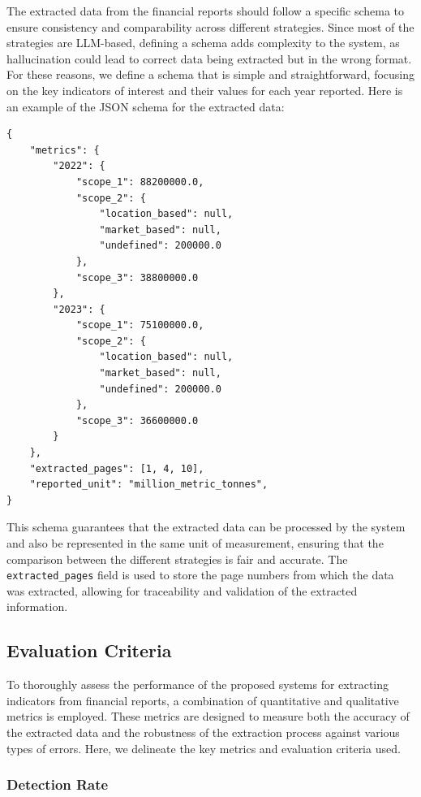 \documentclass[english, 12pt, a4paper, elec, utf8, a-2b, online]{aaltothesis}
\begin{document}
The extracted data from the financial reports should follow a specific schema to ensure consistency and comparability across different strategies.
Since most of the strategies are \ac{LLM}-based, defining a schema adds complexity to the system, as hallucination could lead to correct data being extracted but in the wrong format.
For these reasons, we define a schema that is simple and straightforward, focusing on the key indicators of interest and their values for each year reported.
Here is an example of the \ac{JSON} schema for the extracted data:

\begin{verbatim}
{
    "metrics": {
        "2022": {
            "scope_1": 88200000.0,
            "scope_2": {
                "location_based": null,
                "market_based": null,
                "undefined": 200000.0
            },
            "scope_3": 38800000.0
        },
        "2023": {
            "scope_1": 75100000.0,
            "scope_2": {
                "location_based": null,
                "market_based": null,
                "undefined": 200000.0
            },
            "scope_3": 36600000.0
        }
    },
    "extracted_pages": [1, 4, 10],
    "reported_unit": "million_metric_tonnes",
}
\end{verbatim}

This schema guarantees that the extracted data can be processed by the system and also be represented in the same unit of measurement, ensuring that the comparison between the different strategies is fair and accurate.
The \texttt{extracted\_pages} field is used to store the page numbers from which the data was extracted, allowing for traceability and validation of the extracted information.

\subsection{Evaluation Criteria}

To thoroughly assess the performance of the proposed systems for extracting indicators from financial reports, a combination of quantitative and qualitative metrics is employed.
These metrics are designed to measure both the accuracy of the extracted data and the robustness of the extraction process against various types of errors.
Here, we delineate the key metrics and evaluation criteria used.

\subsubsection{Detection Rate}
\end{document}
